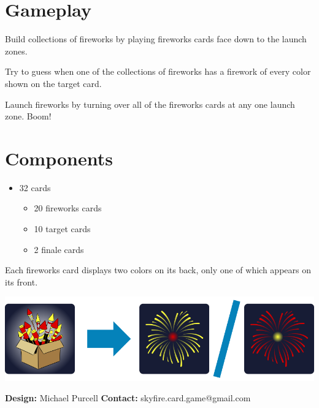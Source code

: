 \documentclass[a5paper, DIV=18, 12pt]{scrartcl}
\begin{document}
\begin{multicols}{2}
\section*{\textcolor{SunriseBlue}{Gameplay}}
Build collections of fireworks by playing fireworks cards face down to the launch zones.

\vspace{2ex}

Try to guess when one of the collections of fireworks has a firework of every color shown on the target card.

\vspace{2ex}

Launch fireworks by turning over all of the fireworks cards at any one launch zone. Boom!
 \vfill\null\columnbreak

\section*{\textcolor{SunriseBlue}{Components}}
\begin{itemize}[nosep, leftmargin=*]
\item 32 cards
	\vspace{0.5ex}
\begin{itemize}[nosep, leftmargin=*]
	\item 20 fireworks cards
	\vspace{0.5ex}
	\item 10 target cards
	\vspace{0.5ex}
	\item 2 finale cards
\end{itemize}
\end{itemize}

\vspace{1ex}

Each fireworks card displays two colors on its back, only one of which appears on its front.

\vspace{-1ex}

\begin{center}
\includegraphics[width=\columnwidth]{Images/sell_sheet_diagram2.png}
\end{center}
\phantom{a}
\end{multicols}

%
\vspace{-4ex}
\textbf{Design:} Michael Purcell \hfill \textbf{Contact:} skyfire.card.game@gmail.com
\end{document}
